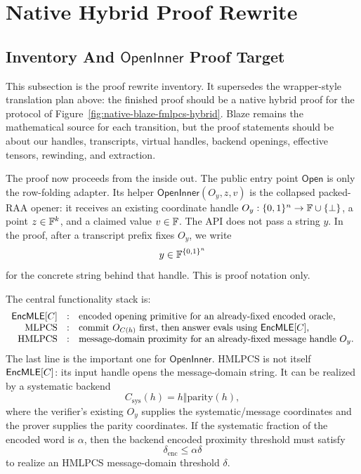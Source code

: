 \section{Native Hybrid Proof Rewrite}

\subsection{Inventory And \(\mathsf{OpenInner}\) Proof Target}

This subsection is the proof rewrite inventory.  It supersedes the
wrapper-style translation plan above: the finished proof should be a native
hybrid proof for the protocol of
Figure~\ref{fig:native-blaze-fmlpcs-hybrid}.  Blaze remains the mathematical
source for each transition, but the proof statements should be about our
handles, transcripts, virtual handles, backend openings, effective tensors,
rewinding, and extraction.

The proof now proceeds from the inside out.  The public entry point
\(\mathsf{Open}\) is only the row-folding adapter.  Its helper
\(\mathsf{OpenInner}(O_y,z,v)\) is the collapsed packed-RAA opener: it receives
an existing coordinate handle \(O_y:\{0,1\}^n\to\mathbb{F}\cup\{\bot\}\), a point
\(z\in\mathbb{F}^k\), and a claimed value \(v\in\mathbb{F}\).  The API does not pass a string
\(y\).  In the proof, after a transcript prefix fixes \(O_y\), we write
\[
  y\in\mathbb{F}^{\{0,1\}^n}
\]
for the concrete string behind that handle.  This is proof notation only.

The central functionality stack is:
\[
\begin{array}{rcl}
\mathsf{EncMLE}[C] &:&
  \text{encoded opening primitive for an already-fixed encoded oracle},\\
\mathrm{MLPCS} &:&
  \text{commit } O_{C(h)} \text{ first, then answer evals using }\mathsf{EncMLE}[C],\\
\mathrm{HMLPCS} &:&
  \text{message-domain proximity for an already-fixed message handle }O_y.
\end{array}
\]
The last line is the important one for \(\mathsf{OpenInner}\).  HMLPCS is not
itself \(\mathsf{EncMLE}[C]\): its input handle opens the message-domain string.  It can
be realized by a systematic backend
\[
  C_{\mathrm{sys}}(h)=h\Vert\mathrm{parity}(h),
\]
where the verifier's existing \(O_y\) supplies the systematic/message
coordinates and the prover supplies the parity coordinates.  If the systematic
fraction of the encoded word is \(\alpha\), then the backend encoded proximity
threshold must satisfy
\[
  \delta_{\mathrm{enc}}\le \alpha\delta
\]
to realize an HMLPCS message-domain threshold \(\delta\).

